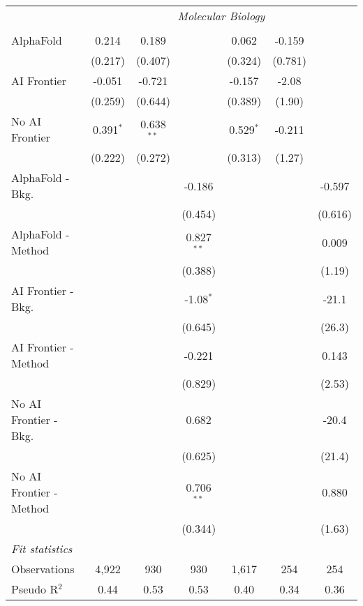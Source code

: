 \begin{tabular}{lcccccc}
 & \multicolumn{6}{c}{\textit{Molecular Biology}} \\ \\
   AlphaFold               & 0.214       & 0.189        &              & 0.062       & -0.159  &   \\   
                           & (0.217)     & (0.407)      &              & (0.324)     & (0.781) &   \\   
   AI Frontier             & -0.051      & -0.721       &              & -0.157      & -2.08   &   \\   
                           & (0.259)     & (0.644)      &              & (0.389)     & (1.90)  &   \\   
   No AI Frontier          & 0.391$^{*}$ & 0.638$^{**}$ &              & 0.529$^{*}$ & -0.211  &   \\   
                           & (0.222)     & (0.272)      &              & (0.313)     & (1.27)  &   \\   
   AlphaFold - Bkg.        &             &              & -0.186       &             &         & -0.597\\   
                           &             &              & (0.454)      &             &         & (0.616)\\   
   AlphaFold - Method      &             &              & 0.827$^{**}$ &             &         & 0.009\\   
                           &             &              & (0.388)      &             &         & (1.19)\\   
   AI Frontier - Bkg.      &             &              & -1.08$^{*}$  &             &         & -21.1\\   
                           &             &              & (0.645)      &             &         & (26.3)\\   
   AI Frontier - Method    &             &              & -0.221       &             &         & 0.143\\   
                           &             &              & (0.829)      &             &         & (2.53)\\   
   No AI Frontier - Bkg.   &             &              & 0.682        &             &         & -20.4\\   
                           &             &              & (0.625)      &             &         & (21.4)\\   
   No AI Frontier - Method &             &              & 0.706$^{**}$ &             &         & 0.880\\   
                           &             &              & (0.344)      &             &         & (1.63)\\   
   \midrule
   \emph{Fit statistics}\\
   Observations            & 4,922       & 930          & 930          & 1,617       & 254     & 254\\  
   Pseudo R$^2$            & 0.44        & 0.53         & 0.53         & 0.40        & 0.34    & 0.36\\  
   

\end{tabular}
